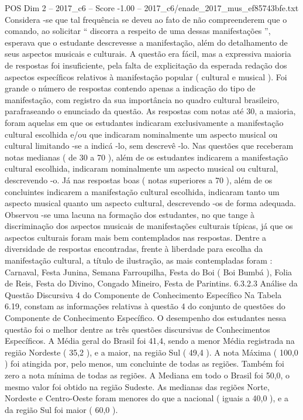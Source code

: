 \begin{textsample}{POS Dim 2 – 2017\_c6 – Score -1.00 – 2017\_c6/enade\_2017\_mus\_ef85743bfe.txt}
Considera -se que tal frequência se deveu ao fato de não compreenderem que o comando, ao solicitar “ discorra a respeito de uma dessas manifestações ”, esperava que o estudante descrevesse a manifestação, além do detalhamento de seus aspectos musicais e culturais.
A questão era fácil, mas a expressiva maioria de respostas foi insuficiente, pela falta de explicitação da esperada redação dos aspectos específicos relativos à manifestação popular ( cultural e musical ).
Foi grande o número de respostas contendo apenas a indicação do tipo de manifestação, com registro da sua importância no quadro cultural brasileiro, parafraseando o enunciado da questão.
As respostas com notas até 30, a maioria, foram aquelas em que os estudantes indicaram exclusivamente a manifestação cultural escolhida e/ou que indicaram nominalmente um aspecto musical ou cultural limitando -se a indicá -lo, sem descrevê -lo.
Nas questões que receberam notas medianas ( de 30 a 70 ), além de os estudantes indicarem a manifestação cultural escolhida, indicaram nominalmente um aspecto musical ou cultural, descrevendo -o.
Já nas respostas boas ( notas superiores a 70 ), além de os concluintes indicarem a manifestação cultural escolhida, indicaram tanto um aspecto musical quanto um aspecto cultural, descrevendo -os de forma adequada.
Observou -se uma lacuna na formação dos estudantes, no que tange à discriminação dos aspectos musicais de manifestações culturais típicas, já que os aspectos culturais foram mais bem contemplados nas respostas.
Dentre a diversidade de respostas encontradas, frente à liberdade para escolha da manifestação cultural, a título de ilustração, as mais contempladas foram : Carnaval, Festa Junina, Semana Farroupilha, Festa do Boi ( Boi Bumbá ), Folia de Reis, Festa do Divino, Congado Mineiro, Festa de Parintins. 6.3.2.3 Análise da Questão Discursiva 4 do Componente de Conhecimento Específico Na Tabela 6.19, constam as informações relativas à questão 4 do conjunto de questões do Componente de Conhecimento Específico.
O desempenho dos estudantes nessa questão foi o melhor dentre as três questões discursivas de Conhecimentos Específicos.
A Média geral do Brasil foi 41,4, sendo a menor Média registrada na região Nordeste ( 35,2 ), e a maior, na região Sul ( 49,4 ).
A nota Máxima ( 100,0 ) foi atingida por, pelo menos, um concluinte de todas as regiões.
Também foi zero a nota mínima de todas as regiões.
A Mediana em todo o Brasil foi 50,0, o mesmo valor foi obtido na região Sudeste.
As medianas das regiões Norte, Nordeste e Centro-Oeste foram menores do que a nacional ( iguais a 40,0 ), e a da região Sul foi maior ( 60,0 ).

\end{textsample}
